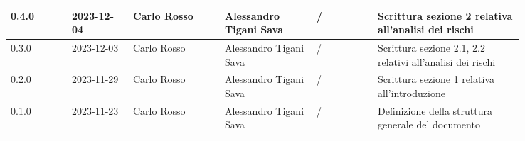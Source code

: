 {\begin{longtable}{p{0.10\linewidth}p{0.10\linewidth}p{0.15\linewidth}p{0.15\linewidth}p{0.10\linewidth}p{0.24\linewidth}}
	  \hline
	  0.4.0             & 2023-12-04    & Carlo Rosso            & Alessandro Tigani Sava & /                    & Scrittura sezione 2 relativa all'analisi dei rischi                      \\
	  \hline
	  0.3.0             & 2023-12-03    & Carlo Rosso            & Alessandro Tigani Sava & /                    & Scrittura sezione 2.1, 2.2 relativi all'analisi dei rischi               \\
	  \hline
	  0.2.0             & 2023-11-29    & Carlo Rosso            & Alessandro Tigani Sava & /                    & Scrittura sezione 1 relativa all'introduzione                            \\
	  \hline
	  0.1.0             & 2023-11-23    & Carlo Rosso            & Alessandro Tigani Sava & /                    & Definizione della struttura generale del documento                       \\
	  \bottomrule
  \end{longtable}
 }
